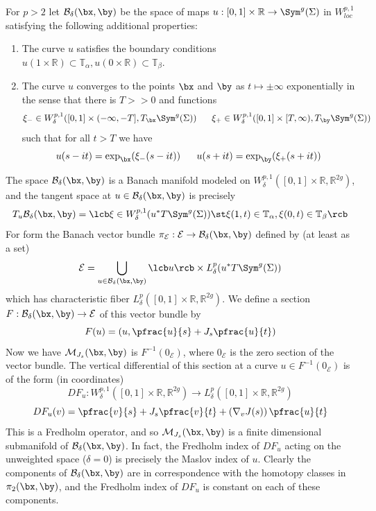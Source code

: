 For $p>2$ let $\mathcal B_\delta(\bx,\by)$ be the space of maps $u : [0,1] \times \mathbb R \rightarrow \mathbb \Sym^g(\Sigma)$ in $W^{p,1}_{loc}$ satisfying the following additional properties:
\begin{enumerate}
	\item The curve $u$ satisfies the boundary conditions $u(1 \times \mathbb R) \subset \mathbb T_\alpha, u(0 \times \mathbb R) \subset \mathbb T_\beta$.
	\item The curve $u$ converges to the points $\bx$ and $\by$ as $t \mapsto \pm\infty$ exponentially in the sense that there is $T >> 0$ and functions
	\[ \xi_- \in W^{p,1}_\delta([0,1] \times (-\infty,-T], T_{\bx} \Sym^g(\Sigma)) \ \ \ \ \ \xi_+ \in W^{p,1}_\delta([0,1] \times [T,\infty), T_{\by} \Sym^g(\Sigma)) \]
	such that for all $t > T$ we have
	\[ u(s-it) = \exp_\bx(\xi_-(s-it)) \ \ \ \ \ u(s+it) = \exp_\by(\xi_+(s+it)) \]
\end{enumerate}
The space $\mathcal B_\delta(\bx,\by)$ is a Banach manifold modeled on $W^{p,1}_\delta([0,1] \times \mathbb R,\mathbb R^{2g})$, and the tangent space at $u \in \mathcal B_\delta(\bx,\by)$ is precisely
\[ T_u \mathcal B_\delta(\bx,\by) = \lcb \xi \in W^{p,1}_\delta(u^*T\Sym^g(\Sigma)) \st \xi(1,t) \in \mathbb T_\alpha, \xi(0,t) \in \mathbb T_\beta \rcb \]
For form the Banach vector bundle $\pi_{\mathcal E} : \mathcal E \rightarrow \mathcal B_\delta(\bx,\by)$ defined by (at least as a set)
\[ \mathcal E = \bigcup_{u \in \mathcal B_\delta(\bx,\by)} \lcb u \rcb \times L^p_\delta(u^*T\Sym^g(\Sigma)) \]
which has characteristic fiber $L^p_\delta([0,1] \times \mathbb R,\mathbb R^{2g})$. We define a section $F : \mathcal B_\delta(\bx,\by) \rightarrow \mathcal E$ of this vector bundle by
\[ F(u) = \left( u, \pfrac{u}{s} + J_s \pfrac{u}{t} \right) \]
Now we have $\mathcal M_{J_s}(\bx,\by)$ is $F^{-1}(0_{\mathcal E})$, where $0_{\mathcal E}$ is the zero section of the vector bundle. The vertical differential of this section at a curve $u \in F^{-1}(0_{\mathcal E})$ is of the form (in coordinates)
\[ DF_u : W^{p,1}_\delta([0,1] \times \mathbb R,\mathbb R^{2g}) \longrightarrow L^p_\delta([0,1] \times \mathbb R,\mathbb R^{2g}) \]
\[ DF_u(v) = \pfrac{v}{s} + J_s \pfrac{v}{t} + \left( \nabla_v J(s) \right) \pfrac{u}{t} \]
This is a Fredholm operator, and so $\mathcal M_{J_s}(\bx,\by)$ is a finite dimensional submanifold of $\mathcal B_\delta(\bx,\by)$. In fact, the Fredholm index of $DF_u$ acting on the unweighted space ($\delta=0$) is precisely the Maslov index of $u$. Clearly the components of $\mathcal B_\delta(\bx,\by)$ are in correspondence with the homotopy classes in $\pi_2(\bx,\by)$, and the Fredholm index of $DF_u$ is constant on each of these components.

